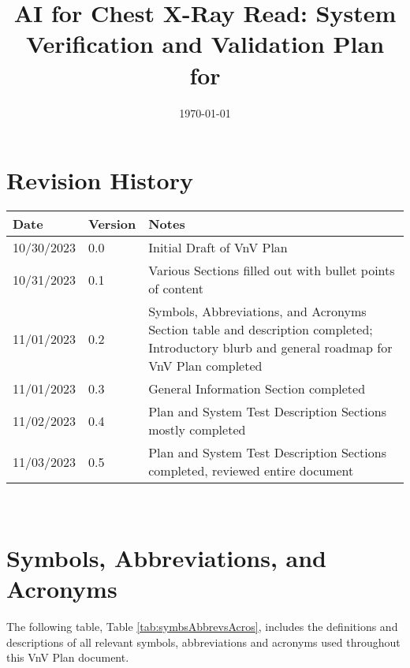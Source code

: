 \documentclass[12pt, titlepage]{article}
\begin{document}
\title{AI for Chest X-Ray Read: System Verification and Validation Plan for \progname{}} 
\author{\authname}
\date{\today}
	
\maketitle


\section*{Revision History}

\begin{tabularx}{\textwidth}{p{3cm}p{2cm}X}
\toprule {\bf Date} & {\bf Version} & {\bf Notes}\\
\midrule
10/30/2023 & 0.0 & Initial Draft of VnV Plan\\
10/31/2023 & 0.1 & Various Sections filled out with bullet points of content\\
11/01/2023 & 0.2 & Symbols, Abbreviations, and Acronyms Section table and description completed; Introductory blurb and general roadmap for VnV Plan completed\\
11/01/2023 & 0.3 & General Information Section completed\\
11/02/2023 & 0.4 & Plan and System Test Description Sections mostly completed\\
11/03/2023 & 0.5 & Plan and System Test Description Sections completed, reviewed entire document\\

\bottomrule
\end{tabularx}

~\\

\newpage

\tableofcontents

\listoftables

\listoffigures

\newpage

\section{Symbols, Abbreviations, and Acronyms}
The following table, Table \ref{tab:symbsAbbrevsAcros}, includes the definitions and descriptions of all relevant symbols, abbreviations and acronyms used throughout this VnV Plan document.
\end{document}
